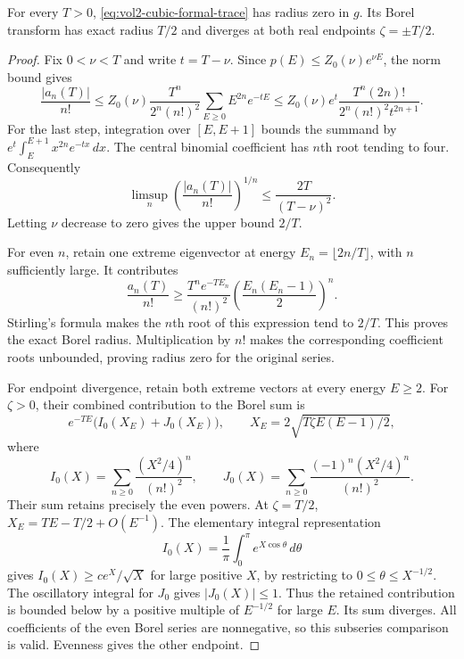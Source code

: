 \begin{theorem}\label{thm:vol2-cubic-borel-radius}
For every \(T>0\), \eqref{eq:vol2-cubic-formal-trace} has radius
zero in \(g\). Its Borel transform has exact radius \(T/2\)
and diverges at both real endpoints \(\zeta=\pm T/2\).
\end{theorem}

\begin{proof}
Fix \(0<\nu<T\) and write \(t=T-\nu\). Since
\(p(E)\leq Z_0(\nu)e^{\nu E}\), the norm bound gives
\[
 \frac{|a_n(T)|}{n!}
 \leq Z_0(\nu)\frac{T^n}{2^n(n!)^2}
          \sum_{E\geq0}E^{2n}e^{-tE}
 \leq Z_0(\nu)e^t
       \frac{T^n(2n)!}{2^n(n!)^2t^{2n+1}}.
\]
For the last step, integration over \([E,E+1]\) bounds the
summand by \(e^t\int_E^{E+1}x^{2n}e^{-tx}\,dx\).
The central binomial coefficient has \(n\)th root tending to four.
Consequently
\[
 \limsup_n\left(\frac{|a_n(T)|}{n!}\right)^{1/n}
 \leq\frac{2T}{(T-\nu)^2}.
\]
Letting \(\nu\) decrease to zero gives the upper bound \(2/T\).

For even \(n\), retain one extreme eigenvector at energy
\(E_n=\lfloor2n/T\rfloor\), with \(n\) sufficiently large.
It contributes
\[
 \frac{a_n(T)}{n!}
 \geq\frac{T^n e^{-TE_n}}{(n!)^2}
          \left(\frac{E_n(E_n-1)}2\right)^n.
\]
Stirling's formula makes the \(n\)th root of this expression
tend to \(2/T\). This proves the exact Borel radius.
Multiplication by \(n!\) makes the corresponding coefficient
roots unbounded, proving radius zero for the original series.

For endpoint divergence, retain both extreme vectors at every
energy \(E\geq2\). For \(\zeta>0\), their combined contribution
to the Borel sum is
\[
 e^{-TE}\bigl(I_0(X_E)+J_0(X_E)\bigr),\qquad
 X_E=2\sqrt{T\zeta E(E-1)/2},
\]
where
\[
 I_0(X)=\sum_{n\geq0}\frac{(X^2/4)^n}{(n!)^2},\qquad
 J_0(X)=\sum_{n\geq0}\frac{(-1)^n(X^2/4)^n}{(n!)^2}.
\]
Their sum retains precisely the even powers. At \(\zeta=T/2\),
\(X_E=TE-T/2+O(E^{-1})\). The elementary integral representation
\[
 I_0(X)=\frac1\pi\int_0^\pi e^{X\cos\theta}\,d\theta
\]
gives \(I_0(X)\geq c e^X/\sqrt X\) for large positive \(X\),
by restricting to \(0\leq\theta\leq X^{-1/2}\).
The oscillatory integral for \(J_0\) gives \(|J_0(X)|\leq1\).
Thus the retained contribution is bounded below by a positive
multiple of \(E^{-1/2}\) for large \(E\). Its sum diverges.
All coefficients of the even Borel series are nonnegative, so
this subseries comparison is valid. Evenness gives the other endpoint.
\end{proof}

